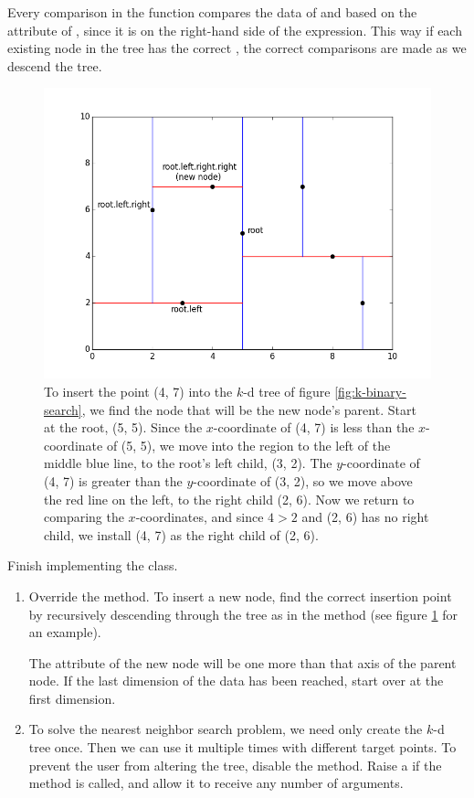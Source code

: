 Every comparison in the  function compares the data of  and  based on the  attribute of , since it is on the right-hand side of the expression.
This way if each existing node in the tree has the correct , the correct comparisons are made as we descend the tree.

\begin{figure}[H]
\includegraphics[width=\textwidth]{kdpic2.png}
\caption{To insert the point (4, 7) into the $k$-d tree of figure \ref{fig:k-binary-search}, we find the node that will be the new node's parent. Start at the root, (5, 5). Since the $x$-coordinate of (4, 7) is less than the $x$-coordinate of (5, 5), we move into the region to the left of the middle blue line, to the root's left child, (3, 2). The $y$-coordinate of (4, 7) is greater than the $y$-coordinate of (3, 2), so we move above the red line on the left, to the right child (2, 6). Now we return to comparing the $x$-coordinates, and since $4 > 2$ and (2, 6) has no right child, we install (4, 7) as the right child of (2, 6).}
\label{fig:k-insert}
\end{figure}

\begin{problem}
Finish implementing the  class.
\begin{enumerate}
\item Override the  method.
To insert a new node, find the correct insertion point by recursively descending through the tree as in the  method (see figure \ref{fig:k-insert} for an example).

The  attribute of the new node will be one more than that axis of the parent node.
If the last dimension of the data has been reached, start over at the first dimension.

\item To solve the nearest neighbor search problem, we need only create the $k$-d tree once.
Then we can use it multiple times with different target points.
To prevent the user from altering the tree, disable the  method.
Raise a  if the method is called, and allow it to receive any number of arguments.
\end{enumerate}
\end{problem}

